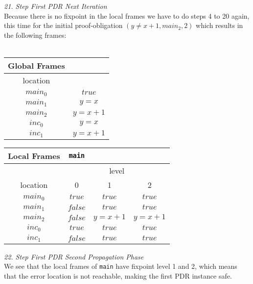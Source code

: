 \documentclass{article}
\begin{document}
\textsl{21. Step First PDR Next Iteration} \\
Because there is no fixpoint in the local frames we have to do steps 4 to 20 again, this time for the initial proof-obligation $(y \neq x + 1, main_2, 2)$ which results in the following frames: \\ \\

	\begin{minipage}{.4\textwidth}
	\setlength\tabcolsep{0.35em}
	\begin{center}
		\begin{tabu}{cc}
			Global Frames \\
			\toprule
			location &  \\
			$main_0$ & $true$  \\
			$main_1$ & $y = x$\\
			$main_2$ & $y = x + 1$ \\
			$inc_0$ & $y = x$  \\
			$inc_1$ & $y = x + 1$\\
			\bottomrule
		\end{tabu}
	\end{center}
\end{minipage}
\hfill
\begin{minipage}{.45\textwidth}
	\setlength\tabcolsep{0.35em}
	\begin{center}
		\begin{tabu}{cccc}
			Local Frames & \texttt{main}\\
			\toprule
			& \multicolumn{3}{c}{level} \\
			\cmidrule(lr){2-4}
			location & 0 & 1 & 2\\
			\cmidrule{1-4}
			$main_0$ & $true$ & $true$ & $true$\\
			$main_1$ & $false$ & $true$ & $true$\\
			$main_2$ & $false$ & $y = x + 1$ & $y = x + 1$\\
			$inc_0$ & $true$ & $true$ & $true$\\
			$inc_1$ & $false$ & $true$ & $true$\\
			\bottomrule
		\end{tabu}
	\end{center}	
\end{minipage}

\vspace*{1em}

\textsl{22. Step First PDR Second Propagation Phase} \\
We see that the local frames of \texttt{main} have fixpoint level 1 and 2, which means that the error location is not reachable, making the first PDR instance safe.  \\ \\
\end{document}
